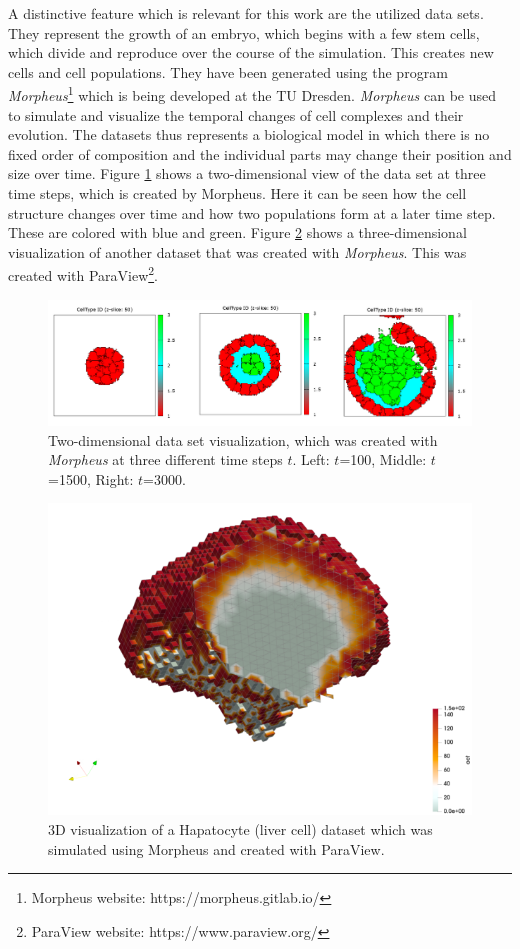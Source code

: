 A distinctive feature which is relevant for this work are the utilized data sets.
They represent the growth of an embryo, which begins with a few stem cells, which divide and reproduce over the course of the simulation. This creates new cells and cell populations.
They have been generated using the program \emph{Morpheus}\footnote{Morpheus website: https://morpheus.gitlab.io/} which is being developed at the TU Dresden.\cite{morpheus_2022}
\emph{Morpheus} can be used to simulate and visualize the temporal changes of cell complexes and their evolution. 
The datasets thus represents a biological model in which there is no fixed order of composition and the individual parts may change their position and size over time.  
Figure \ref{fig:Dataset2D} shows a two-dimensional view of the data set at three time steps, which is created by Morpheus. Here it can be seen how the cell structure changes over time and how two populations form at a later time step. These are colored with blue and green. 
Figure \ref{fig:Dataset3D} shows a three-dimensional visualization of another dataset that was created with \emph{Morpheus}. This was created with ParaView\footnote{ParaView website: https://www.paraview.org/}.
\begin{figure}[h]
	\centering
	\includegraphics[width=1\linewidth]{fig/Images/Dataset2D}
	\caption[]{Two-dimensional data set visualization, which was created with \emph{Morpheus} at three different time steps $t$. Left: $t$=100, Middle: $t$=1500, Right: $t$=3000.}
	\label{fig:Dataset2D}
\end{figure}

\begin{figure}[h]
	\centering
	\includegraphics[width=0.7\linewidth]{fig/Images/Dataset3D}
	\caption[]{3D visualization of a Hapatocyte (liver cell) dataset which was simulated using Morpheus and created with ParaView.}
	\label{fig:Dataset3D}
\end{figure}
